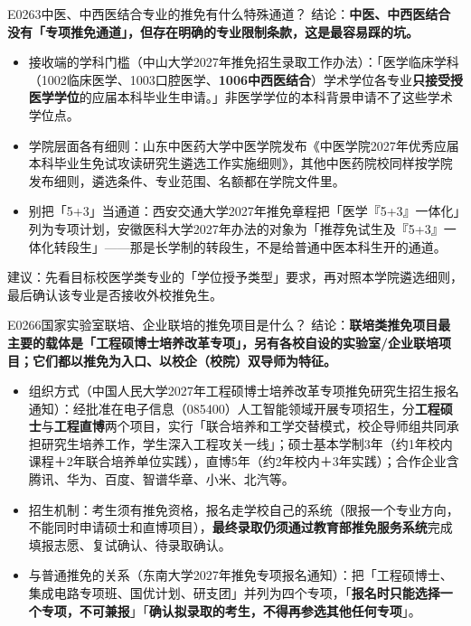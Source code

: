 \begin{qa}{E0263}{中医、中西医结合专业的推免有什么特殊通道？}
结论：\textbf{中医、中西医结合没有「专项推免通道」，但存在明确的专业限制条款，这是最容易踩的坑。}
\begin{itemize}
  \item 接收端的学科门槛（中山大学2027年推免招生录取工作办法）：「医学临床学科（1002临床医学、1003口腔医学、\textbf{1006中西医结合}）学术学位各专业\textbf{只接受授医学学位}的应届本科毕业生申请。」非医学学位的本科背景申请不了这些学术学位点。
  \item 学院层面各有细则：山东中医药大学中医学院发布《中医学院2027年优秀应届本科毕业生免试攻读研究生遴选工作实施细则》，其他中医药院校同样按学院发布细则，遴选条件、专业范围、名额都在学院文件里。
  \item 别把「5+3」当通道：西安交通大学2027年推免章程把「医学『5+3』一体化」列为专项计划，安徽医科大学2027年办法的对象为「推荐免试生及『5+3』一体化转段生」——那是长学制的转段生，不是给普通中医本科生开的通道。
\end{itemize}
建议：先看目标校医学类专业的「学位授予类型」要求，再对照本学院遴选细则，最后确认该专业是否接收外校推免生。
\end{qa}

\begin{qa}{E0266}{国家实验室联培、企业联培的推免项目是什么？}
结论：\textbf{联培类推免项目最主要的载体是「工程硕博士培养改革专项」，另有各校自设的实验室/企业联培项目；它们都以推免为入口、以校企（校院）双导师为特征。}
\begin{itemize}
  \item 组织方式（中国人民大学2027年工程硕博士培养改革专项推免研究生招生报名通知）：经批准在电子信息（085400）人工智能领域开展专项招生，分\textbf{工程硕士}与\textbf{工程直博}两个项目，实行「联合培养和工学交替模式，校企导师组共同承担研究生培养工作，学生深入工程攻关一线」；硕士基本学制3年（约1年校内课程＋2年联合培养单位实践），直博5年（约2年校内＋3年实践）；合作企业含腾讯、华为、百度、智谱华章、小米、北汽等。
  \item 招生机制：考生须有推免资格，报名走学校自己的系统（限报一个专业方向，不能同时申请硕士和直博项目），\textbf{最终录取仍须通过教育部推免服务系统}完成填报志愿、复试确认、待录取确认。
  \item 与普通推免的关系（东南大学2027年推免专项报名通知）：把「工程硕博士、集成电路专项班、国优计划、研支团」并列为四个专项，「\textbf{报名时只能选择一个专项，不可兼报}」「\textbf{确认拟录取的考生，不得再参选其他任何专项}」。
\end{itemize}
\end{qa}

